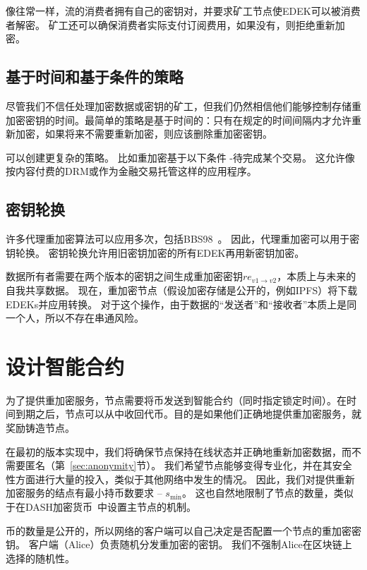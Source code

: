\documentclass[longbibliography,nofootinbib]{revtex4-1}
\begin{document}
\begin{CJK*}{UTF8}{gbsn}
    像往常一样，流的消费者拥有自己的密钥对，并要求矿工节点使EDEK可以被消费者解密。 矿工还可以确保消费者实际支付订阅费用，如果没有，则拒绝重新加密。


\subsection{基于时间和基于条件的策略}

    尽管我们不信任处理加密数据或密钥的矿工，但我们仍然相信他们能够控制存储重加密密钥的时间。最简单的策略是基于时间的：只有在规定的时间间隔内才允许重新加密，如果将来不需要重新加密，则应该删除重加密密钥。
    
    可以创建更复杂的策略。 比如重加密基于以下条件 -待完成某个交易。 这允许像按内容付费的DRM或作为金融交易托管这样的应用程序。


\subsection{密钥轮换}
\label{sec:key-rotation}

    许多代理重加密算法可以应用多次，包括BBS98~\cite{BBS98}。 因此，代理重加密可以用于密钥轮换。 密钥轮换允许用旧密钥加密的所有EDEK再用新密钥加密。
    
    数据所有者需要在两个版本的密钥之间生成重加密密钥$re_{v1\rightarrow v2}$，本质上与未来的自我共享数据。 现在，重加密节点（假设加密存储是公开的，例如IPFS）将下载EDEKs并应用转换。 对于这个操作，由于数据的“发送者”和“接收者”本质上是同一个人，所以不存在串通风险。

\section{设计智能合约}
\label{sec:smart-contract}

为了提供重加密服务，节点需要将币发送到智能合约（同时指定锁定时间）。在时间到期之后，节点可以从中收回代币。目的是如果他们正确地提供重加密服务，就奖励铸造节点。

    在最初的版本实现中，我们将确保节点保持在线状态并正确地重新加密数据，而不需要匿名（第~\ref{sec:anonymity}节）。 我们希望节点能够变得专业化，并在其安全性方面进行大量的投入，类似于其他网络中发生的情况。 因此，我们对提供重新加密服务的结点有最小持币数要求 – $s_{\min}$。 这也自然地限制了节点的数量，类似于在DASH加密货币~\cite{dash:whitepaper}中设置主节点的机制。
    
    币的数量是公开的，所以网络的客户端可以自己决定是否配置一个节点的重加密密钥。 客户端（Alice）负责随机分发重加密的密钥。 我们不强制Alice在区块链上选择的随机性。
    

\end{CJK*}
\end{document}
